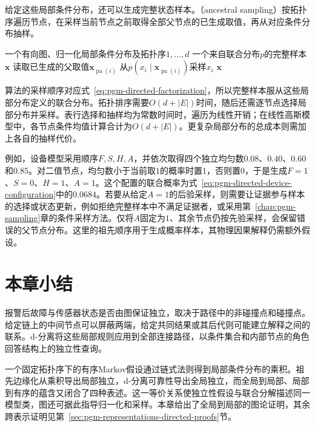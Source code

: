 给定这些局部条件分布，还可以生成完整状态样本。（ancestral sampling）按拓扑序遍历节点，在采样当前节点之前取得全部父节点的已生成取值，再从对应条件分布抽样。
\begin{algorithm}[有向图上的祖先采样]
  \label{alg:pgm-directed-ancestral-sampling}
  \begin{algorithmic}[1]
    \Require 一个有向图、归一化局部条件分布及拓扑序$1,\ldots,d$
    \Ensure 一个来自联合分布$p$的完整样本$\bm{x}$
      \State 读取已生成的父取值$\bm{x}_{\operatorname{pa}(i)}$
      \State 从$p(x_i\mid\bm{x}_{\operatorname{pa}(i)})$采样$x_i$
    \EndFor
    \State \Return $\bm{x}$
  \end{algorithmic}
\end{algorithm}
算法的采样顺序对应式~\eqref{eq:pgm-directed-factorization}，所以完整样本服从这些局部分布定义的联合分布。拓扑排序需要$O(d+|E|)$时间，随后还需逐节点选择局部分布并采样。表行选择和抽样均为常数时间时，遍历为线性开销；在线性高斯模型中，各节点条件均值计算合计为$O(d+|E|)$。更复杂局部分布的总成本则需加上各自的抽样代价。

例如，设备模型采用顺序$F,S,H,A$，并依次取得四个独立均匀数$0.08$、$0.40$、$0.60$和$0.85$。对二值节点，均匀数小于当前取$1$的概率时置$1$，否则置$0$，于是生成$F=1$、$S=0$、$H=1$、$A=1$。这个配置的联合概率为式~\eqref{eq:pgm-directed-device-configuration}中的$0.0684$。若要从给定$A=1$的后验采样，则需要让证据参与样本的选择或状态更新，例如拒绝完整样本中不满足证据者，或采用第~\ref{chap:pgm-sampling}章的条件采样方法。仅将$A$固定为$1$、其余节点仍按先验采样，会保留错误的父节点分布。这里的祖先顺序用于生成概率样本，其物理因果解释仍需额外假设。

\section{本章小结}
\label{sec:pgm-directed-summary}

报警后故障与传感器状态是否由图保证独立，取决于路径中的非碰撞点和碰撞点。给定链上的中间节点可以屏蔽两端，给定共同结果或其后代则可能建立解释之间的联系。d-分离将这些局部规则应用到全部连接路径，以条件集合和内部节点的角色回答结构上的独立性查询。

一个固定拓扑序下的有序Markov假设通过链式法则得到局部条件分布的乘积。祖先边缘化从乘积导出局部独立，d-分离可靠性导出全局独立，而全局到局部、局部到有序的蕴含又闭合了四种表述。这一等价关系使独立性假设与联合分解描述同一模型类，图还可据此指导归一化和采样。本章给出了全局到局部的图论证明，其余跨表示证明见第~\ref{sec:pgm-representations-directed-proofs}节。


